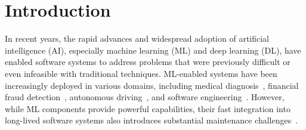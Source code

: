 \documentclass[acmsmall,screen,review,anonymous]{acmart}
\begin{document}



\maketitle

\section{Introduction}


In recent years, the rapid advances and widespread adoption of artificial intelligence (AI), especially machine learning (ML) and deep learning (DL), have enabled software systems to address problems that were previously difficult or even infeasible with traditional techniques. ML-enabled systems have been increasingly deployed in various domains, including medical diagnosis~\cite{}, financial fraud detection~\cite{}, autonomous driving~\cite{}, and software engineering~\cite{amershi2019software}. However, while ML components provide powerful capabilities, their fast integration into long-lived software systems also introduces substantial maintenance challenges~\cite{sklavenitis2024measuring}. 
\end{document}
